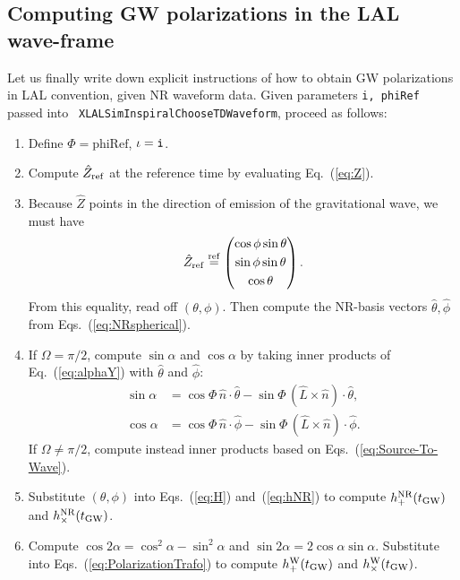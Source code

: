 \documentclass[11pt,tightenlines,article,amssymb,amsmath,amsfonts,superscriptaddress]{revtex4}
\newcommand{\tNR}{\theta}
\newcommand{\pNR}{\phi}
\newcommand{\EtNR}{{\hat\theta}}
\newcommand{\EpNR}{{\hat\phi}}
\newcommand{\hpNR}{h_+^{\rm NR}}
\newcommand{\hcNR}{h_{\times}^{\rm NR}}
\newcommand{\nNR}{\hat{n}}
\newcommand{\lNR}{\hat L}
\newcommand{\tGW}{t_{\rm GW}}
\newcommand{\EzW}{\hat Z}
\newcommand{\hpW}{h_+^{\rm W}}
\newcommand{\hcW}{h_\times^{\rm W}}
\newcommand{\phiRef}{\Phi} %
\newcommand{\equalref}{\overset{\rm ref}{=}}
\begin{document}
\subsection{Computing GW polarizations in the LAL wave-frame}
\label{sec:NR-LAL-Trafo}

Let us finally write down explicit instructions of how to obtain GW
polarizations in LAL convention, given NR waveform data.  
Given parameters {\tt i, phiRef} passed into {\tt
  XLALSimInspiralChooseTDWaveform}, proceed as follows:

\begin{enumerate}
\item Define $\phiRef=\mbox{phiRef}$, $\iota={\tt i}$.
\item Compute $\EzW_{\rm ref}$ at the reference time by evaluating Eq.~(\ref{eq:Z}).
\item Because $\EzW$ points in the direction of emission of the
gravitational wave, we must have
\begin{equation}
  \EzW_{\rm ref} \equalref
  \left(\begin{gathered}
    \cos\pNR\sin\tNR\\
    \sin\pNR\sin\tNR\\
    \cos\tNR\end{gathered}
    \right).
\end{equation}
From this equality, read off $(\tNR, \pNR)$.  Then compute the
NR-basis vectors $\EtNR, \EpNR$ from Eqs.~(\ref{eq:NRspherical}).
\item If $\Omega=\pi/2$, compute $\sin\alpha$ and $\cos\alpha$ by taking inner products
  of Eq.~(\ref{eq:alphaY}) with $\EtNR$ and $\EpNR$:
  \begin{subequations}
  \begin{align}
    \sin\alpha& = \cos\phiRef\,\nNR\cdot\EtNR- \sin\phiRef\,(\lNR\times\nNR)\cdot\EtNR,\\
    \cos\alpha& = \cos\phiRef\,\nNR\cdot\EpNR - \sin\phiRef\,(\lNR\times\nNR)\cdot\EpNR.
  \end{align}
\end{subequations}
  If $\Omega\neq \pi/2$, compute instead inner products based on
  Eqs.~(\ref{eq:Source-To-Wave}).
\item Substitute $(\tNR, \pNR)$ into Eqs.~(\ref{eq:H})
  and~(\ref{eq:hNR}) to compute $\hpNR(\tGW)$ and $\hcNR(\tGW)$.
\item Compute $\cos 2\alpha=\cos^2\alpha\!-\!\sin^2\alpha$ and $\sin 2\alpha=2\cos\alpha\sin\alpha$.  Substitute into Eqs.~(\ref{eq:PolarizationTrafo}) to compute $\hpW(\tGW)$ and $\hcW(\tGW)$.
\end{enumerate}
\end{document}
